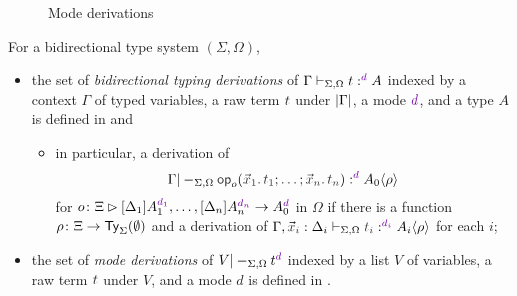 \begin{definition}
\begin{figure}
    \small
    \caption{Mode derivations}
    \label{fig:mode-derivations}
  \end{figure}
  For a bidirectional type system $(\Sigma, \Omega)$,
  \begin{itemize}
    \item the set of \emph{bidirectional typing derivations} of $\Gamma \vdash_{\Sigma, \Omega} t :^\dir{d} A$ indexed by a context $\Gamma$ of typed variables, a raw term $\isTerm{t}$ under $\left|\Gamma\right|$, a mode $\dir{d}$, and a type $A$ is defined in  and 
      \begin{itemize}
        \item in particular, a derivation of
          \[
            \Gamma |-_{\Sigma, \Omega} \tmOpts :^{\dir{d}} \simsub{A_0}{\rho}
          \]
          for $\aritysymbol{o}{\Xi}{[\Delta_1]A_{1}^{\dir{d_1}}, \ldots, [\Delta_{n}] A_{n}^{\dir{d_n}}}{A_0^{\dir{d}}}$ in $\Omega$ if there is a function $\rho\colon \Xi \to \mathsf{Ty}_{\Sigma}(\emptyset)$ and a derivation of $\Gamma, \vars{x}_{\isTerm{i}} : \Delta_i \vdash_{\Sigma, \Omega} \isTerm{t_i} :^{\dir{d_i}} \simsub{A_i}{\rho}$ for each $i$;
      \end{itemize}
    \item the set of \emph{mode derivations} of $V |-_{\Sigma, \Omega} t^\dir{d}$ indexed by a list $V$ of variables, a raw term $\isTerm{t}$ under $V$, and a mode $d$ is defined in .
  \end{itemize}
\end{definition}


